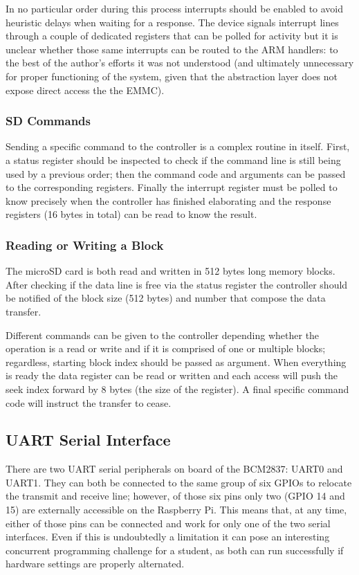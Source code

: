 \documentclass[12pt,a4paper,openright,twoside]{report}
\begin{document}
In no particular order during this process interrupts should be enabled to 
avoid heuristic delays when waiting for a response. The device signals interrupt
lines through a couple of dedicated registers that can be polled for activity but
it is unclear whether those same interrupts can be routed to the ARM handlers:
to the best of the author's efforts it was not understood (and ultimately unnecessary
for proper functioning of the system, given that the abstraction layer does not
expose direct access the the EMMC).

\subsubsection{SD Commands}
Sending a specific command to the controller is a complex routine in itself. First,
a status register should be inspected to check if the command line is still being
used by a previous order; then the command code and arguments can be passed to 
the corresponding registers.
Finally the interrupt register must be polled to know precisely when the controller has
finished elaborating and the response registers (16 bytes in total) can be 
read to know the result.

\subsubsection{Reading or Writing a Block}
The microSD card is both read and written in 512 bytes long memory blocks. After
checking if the data line is free via the status register the controller should
be notified of the block size (512 bytes) and number that compose the data transfer.

Different commands can be given to the controller depending whether the operation
is a read or write and if it is comprised of one or multiple blocks; regardless,
starting block index should be passed as argument. When everything
is ready the data register can be read or written and each access will push the seek
index forward by 8 bytes (the size of the register). A final specific command code
will instruct the transfer to cease.


\subsection{UART Serial Interface}
\label{serial}
There are two UART serial peripherals on board of the BCM2837: UART0 and UART1.
They can both be connected to the same group of six GPIOs to relocate the 
transmit and receive line; however, of those six pins only two (GPIO 14 and 15)
are externally accessible on the Raspberry Pi. This means that, at any time,
either of those pins can be connected and work for only one of the two serial
interfaces.
Even if this is undoubtedly a limitation it can pose an interesting
concurrent programming challenge for a student, as both can run successfully if 
hardware settings are properly alternated.
\end{document}
